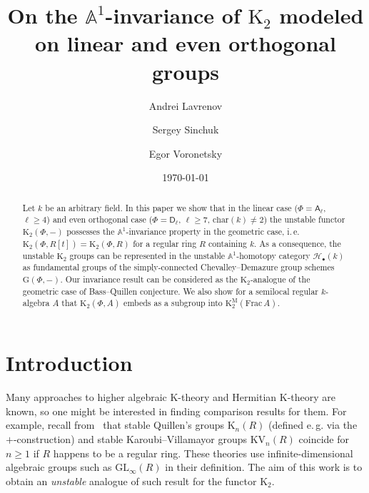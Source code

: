 \documentclass[oneside, 11pt]{amsart}
\title{On the $\mathbb{A}^1$-invariance of $\mathrm K_2$ modeled on linear and even orthogonal groups}
\author{Andrei Lavrenov}
\author{Sergey Sinchuk}
\author{Egor Voronetsky}
\date {\today}
\numberwithin{equation}{section}
\newcommand{\K}{{\mathrm{K}}}
\theoremstyle{definition}
\theoremstyle{definition}
\theoremstyle{remark}
\newcommand{\rA}{\mathsf{A}}
\newcommand{\rD}{\mathsf{D}}
\begin{document}
\maketitle

\begin{abstract}Let $k$ be an arbitrary field. In this paper we show that in the linear case ($\Phi=\rA_\ell$, $\ell \geq 4$) and even orthogonal case ($\Phi = \rD_\ell$, $\ell\geq 7$, $\mathrm{char}(k)\neq 2$) the unstable functor $\mathrm{K}_2(\Phi, -)$ possesses the $\mathbb{A}^1$-invariance property in the geometric case, i.\,e. $\K_2(\Phi, R[t]) = \K_2(\Phi, R)$ for a regular ring $R$ containing $k$. As a consequence, the unstable $\K_2$ groups can be represented in the unstable $\mathbb{A}^1$-homotopy category $\mathscr{H}_\bullet(k)$ as fundamental groups of the simply-connected Chevalley--Demazure group schemes $\mathrm{G}(\Phi,-)$. Our invariance result can be considered as the $\K_2$-analogue of the geometric case of Bass--Quillen conjecture. We also show for a semilocal regular $k$-algebra $A$ that $\K_2(\Phi, A)$ embeds as a subgroup into $\K^\mathrm{M}_2(\mathrm{Frac}\,A)$.
\end{abstract}

\section{Introduction}

Many approaches to higher algebraic $\K$-theory and Hermitian $\K$-theory are known, so one might be interested in finding comparison results for them.
For example, recall from~\cite[Theorem~IV.11.8]{Kbook} that stable Quillen's groups $\K_n(R)$ (defined e.\,g. via the $+$-construction) and stable Karoubi--Villamayor groups $\mathrm{KV}_n(R)$ coincide for $n\geq 1$ if $R$ happens to be a regular ring.
These theories use infinite-dimensional algebraic groups such as $\mathrm{GL}_\infty(R)$ in their definition. 
The aim of this work is to obtain an {\it unstable} analogue of such result for the functor $\K_2$.
\end{document}
